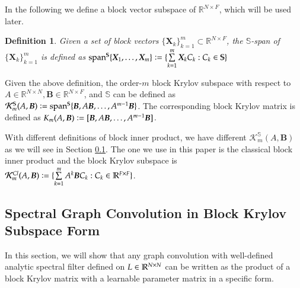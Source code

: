 \documentclass{article}
\newtheorem{definition}{Definition}
\begin{document}
In the following we define a block vector subspace  of $\mathbb{R}^{N\times F}$, which will be used later.
\begin{definition}
Given a set of block vectors $\{\bm{X}_k \}_{k=1}^m \subset \mathbb{R}^{N\times F} $, the $\mathbb{S}$-span of $\{\bm{X}_k \}_{k=1}^m$ is defined as $\mathrm{span}^{\mathbb{S}} \{\bm{X}_1, \dots, \bm{X}_m\} \vcentcolon = \{ \sum\limits_{k=1}^{m} \bm{X}_k C_k: C_k \in  \mathbb{S} \}$
\end{definition}
Given the above definition, the order-$m$ block Krylov subspace with respect to $A\in \mathbb{R}^{N\times N},\bm{B}\in \mathbb{R}^{N\times F}$, and  $\mathbb{S}$ can be defined as $\mathcal{K}_m^{\mathbb{S}} (A,\bm{B}) \vcentcolon = \text{span}^{\mathbb{S}} \{\bm{B}, A\bm{B}, \dots, A^{m-1} \bm{B}\} $. The corresponding block Krylov matrix is defined as $K_m (A,\bm{B})\vcentcolon = [ \bm{B}, A\bm{B}, \dots, A^{m-1} \bm{B}]$.

With different definitions of block inner product, we have different  $\mathcal{K}_m^{\mathbb{S}} (A,\bm{B})$ as we will see in Section \ref{conv_in_krylov}.  The one we use in this paper is the classical block inner product and the block Krylov subspace is $\mathcal{K}_m^{Cl} (A,\bm{B}) \vcentcolon= \{ \sum\limits_{k=1}^{m} A^k \bm{B} C_k : C_k \in \mathbb{R}^{F\times F}\}$.
\subsection{Spectral Graph Convolution in Block Krylov Subspace Form}
\label{conv_in_krylov}
In this section, we will show that any graph convolution with well-defined analytic spectral filter defined on $\boldmath{L} \in \mathbb{R}^{N\times N}$ can be written as the product of a block Krylov matrix with a learnable parameter matrix in a specific form.
\end{document}
